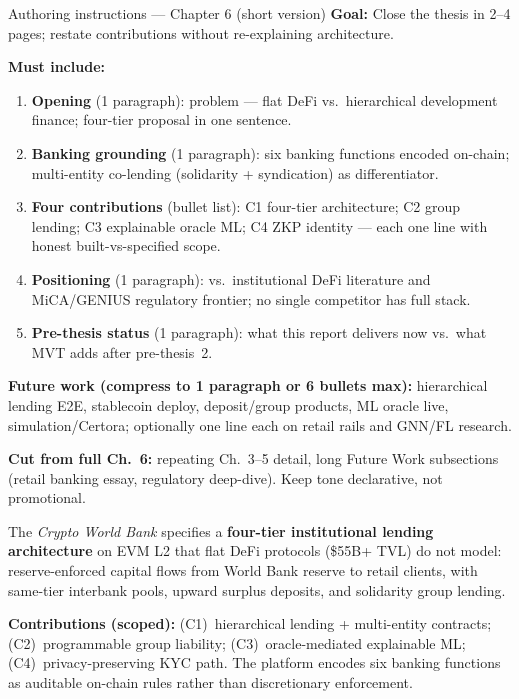 \documentclass[12pt, a4paper]{report}
\begin{document}
\begin{chapterinstruction}{Authoring instructions --- Chapter 6 (short version)}
\textbf{Goal:} Close the thesis in 2--4 pages; restate contributions without re-explaining architecture.

\textbf{Must include:}
\begin{enumerate}[noitemsep]
\item \textbf{Opening} (1 paragraph): problem --- flat DeFi vs.\ hierarchical development finance; four-tier proposal in one sentence.
\item \textbf{Banking grounding} (1 paragraph): six banking functions encoded on-chain; multi-entity co-lending (solidarity + syndication) as differentiator.
\item \textbf{Four contributions} (bullet list): C1 four-tier architecture; C2 group lending; C3 explainable oracle ML; C4 ZKP identity --- each one line with honest built-vs-specified scope.
\item \textbf{Positioning} (1 paragraph): vs.\ institutional DeFi literature and MiCA/GENIUS regulatory frontier; no single competitor has full stack.
\item \textbf{Pre-thesis status} (1 paragraph): what this report delivers now vs.\ what MVT adds after pre-thesis~2.
\end{enumerate}

\textbf{Future work (compress to 1 paragraph or 6 bullets max):} hierarchical lending E2E, stablecoin deploy, deposit/group products, ML oracle live, simulation/Certora; optionally one line each on retail rails and GNN/FL research.

\textbf{Cut from full Ch.~6:} repeating Ch.~3--5 detail, long Future Work subsections (retail banking essay, regulatory deep-dive). Keep tone declarative, not promotional.
\end{chapterinstruction}

The \textit{Crypto World Bank} specifies a \textbf{four-tier institutional lending architecture} on EVM L2 that flat DeFi protocols (\$55B+ TVL) do not model: reserve-enforced capital flows from World Bank reserve to retail clients, with same-tier interbank pools, upward surplus deposits, and solidarity group lending.

\textbf{Contributions (scoped):} (C1)~hierarchical lending + multi-entity contracts; (C2)~programmable group liability; (C3)~oracle-mediated explainable ML; (C4)~privacy-preserving KYC path. The platform encodes six banking functions as auditable on-chain rules rather than discretionary enforcement.
\end{document}
